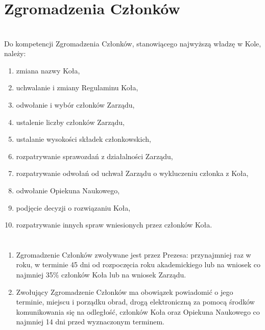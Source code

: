 \documentclass[a4paper]{article}
\begin{document}
\section*{Zgromadzenia Członków~~}
\section{}
Do kompetencji Zgromadzenia Członków, stanowiącego najwyższą władzę w Kole, należy:
  \begin{enumerate}[label=\alph*)]
  \item zmiana nazwy Koła,
  \item uchwalanie i zmiany Regulaminu Koła,
  \item odwołanie i wybór członków Zarządu, 
  \item ustalenie liczby członków Zarządu,
  \item ustalanie wysokości składek członkowskich,
  \item rozpatrywanie sprawozdań z działalności Zarządu,
  \item rozpatrywanie odwołań od uchwał Zarządu o wykluczeniu członka z Koła,
  \item odwołanie Opiekuna Naukowego,
  \item podjęcie decyzji o rozwiązaniu Koła,
  \item rozpatrywanie innych spraw wniesionych przez członków Koła.
  \end{enumerate}

\section{}
\label{Tryb}
\begin{enumerate}
\item Zgromadzenie Członków zwoływane jest przez Prezesa: przynajmniej raz w roku, w terminie 45 dni od rozpoczęcia roku akademickiego lub na wniosek co najmniej 35\% członków Koła lub na wniosek Zarządu.
\item Zwołujący Zgromadzenie Członków ma obowiązek powiadomić o jego terminie, miejscu i porządku obrad, drogą elektroniczną za pomocą środków komunikowania się na odległość, członków Koła oraz Opiekuna Naukowego co najmniej 14 dni przed wyznaczonym terminem.
\end{enumerate}

\section{}
\end{document}

